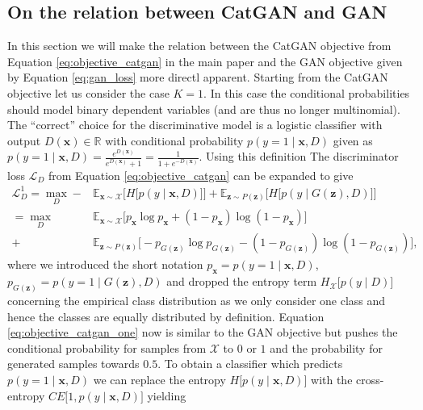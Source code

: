 \documentclass{article} \usepackage{iclr2016_conference,times}
\newcommand{\bx}{\mathbf{x}}
\newcommand{\bz}{\mathbf{z}}
\begin{document}
\begin{appendix}

\section{On the relation between CatGAN and GAN}
In this section we will make the relation between the CatGAN objective
from Equation \eqref{eq:objective_catgan} in the main paper and the
GAN objective given by Equation \eqref{eq:gan_loss} more directl
apparent.  Starting from the CatGAN objective let us consider the case
$K=1$. In this case the conditional probabilities should model binary
dependent variables (and are thus no longer multinomial). The
``correct'' choice for the discriminative model is a logistic
classifier with output $D(\bx) \in \mathbb{R}$ with
conditional probability $p(y = 1 \mid \bx, D)$ given as
$p(y = 1 \mid \bx, D) = \frac{e^{D(\bx)}}{e^{D(\bx)} + 1} = \frac{1}{1 + e^{-D(\bx)}}$. Using this
definition The discriminator loss $\mathcal{L}_D$ from Equation
\eqref{eq:objective_catgan} can be expanded to give
\begin{equation}
\begin{aligned}
  \mathcal{L}^1_{D} = \max_{D} - &\mathbb{E}_{\bx \sim
                                \mathcal{X}} \Big[ H \big[ p(y
                                 \mid \bx, D) \big]  \Big] + \mathbb{E}_{\bz
    \sim P(\bz)} \Big[ H\big[ p(y \mid G(\bz), D) \big]  \Big]
 \\
 = \max_{D} \  &\mathbb{E}_{\bx \sim \mathcal{X}} \Big[  p_{\bx} \log  p_{\bx} + (1 - p_{\bx}) \log (1 - p_{\bx})  \Big]  \\
  + &\mathbb{E}_{\bz \sim P(\bz)} \Big[-p_{G(\bz)} \log p_{G(\bz)} - (1 - p_{G(\bz)}) \log (1 - p_{G(\bz)}) \Big],
\label{eq:objective_catgan_one}
\end{aligned}
\end{equation}
where we introduced the short notation
$p_{\bx} = p(y = 1 \mid \bx, D)$,
$p_{G(\bz)} = p(y = 1 \mid G(\bz), D)$ and dropped the entropy term
$H_{\mathcal{X}} \Big [ p( y \mid D ) \Big ]$ concerning the empirical
class distribution as we only consider one class and hence the classes
are equally distributed by definition. Equation \eqref{eq:objective_catgan_one}
now is similar to the GAN objective but pushes the conditional
probability for samples from $\mathcal{X}$ to $0$ or $1$ and the
probability for generated samples towards $0.5$. To obtain a
classifier which predicts $p(y=1 \mid \bx, D)$ we can replace the
entropy $H \big[ p(y \mid \bx, D) \big]$ with the cross-entropy $CE \big[1, p(y \mid \bx, D) \big]$ yielding

\end{appendix}
\end{document}
